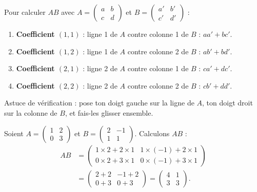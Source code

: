 \documentclass[11pt]{article}
\begin{document}
\begin{methode}
Pour calculer $AB$ avec $A = \begin{pmatrix} a & b \\ c & d \end{pmatrix}$ et $B = \begin{pmatrix} a' & b' \\ c' & d' \end{pmatrix}$ :
\begin{enumerate}
\item \textbf{Coefficient $(1,1)$} : ligne 1 de $A$ contre colonne 1 de $B$ : $aa' + bc'$.
\item \textbf{Coefficient $(1,2)$} : ligne 1 de $A$ contre colonne 2 de $B$ : $ab' + bd'$.
\item \textbf{Coefficient $(2,1)$} : ligne 2 de $A$ contre colonne 1 de $B$ : $ca' + dc'$.
\item \textbf{Coefficient $(2,2)$} : ligne 2 de $A$ contre colonne 2 de $B$ : $cb' + dd'$.
\end{enumerate}
Astuce de vérification : pose ton doigt gauche sur la ligne de $A$, ton doigt droit sur la colonne de $B$, et fais-les glisser ensemble.
\end{methode}

\begin{exemplebox}
Soient $A = \begin{pmatrix} 1 & 2 \\ 0 & 3 \end{pmatrix}$ et $B = \begin{pmatrix} 2 & -1 \\ 1 & 1 \end{pmatrix}$. Calculons $AB$ :
\begin{align*}
AB &= \begin{pmatrix} 1\times 2 + 2\times 1 & 1\times(-1) + 2\times 1 \\ 0\times 2 + 3\times 1 & 0\times(-1) + 3\times 1 \end{pmatrix} \\
&= \begin{pmatrix} 2+2 & -1+2 \\ 0+3 & 0+3 \end{pmatrix} = \begin{pmatrix} 4 & 1 \\ 3 & 3 \end{pmatrix}.
\end{align*}
\end{exemplebox}
\end{document}
